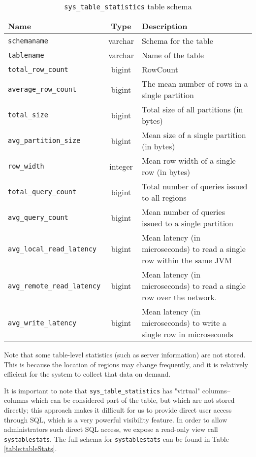 \begin{table}
				\begin{tabular}{|l|c|p{6cm}|}
								\hline
								\bf{Name}															& \bf{Type}	&	\bf{Description} \\ \hline	
								\texttt{schemaname}										&	varchar		&	Schema for the table \\ \hline
								\texttt{tablename}										&	varchar		&	Name of the table \\ \hline
								\texttt{total\_row\_count}						&	bigint		& RowCount \\ \hline
								\texttt{average\_row\_count}					&	bigint		& The mean number of rows in a single partition \\ \hline
								\texttt{total\_size}									&	bigint		&	Total size of all partitions (in bytes) \\ \hline
								\texttt{avg\_partition\_size}					&	bigint		&	Mean size of a single partition (in bytes) \\ \hline
								\texttt{row\_width}										&	integer		&	Mean row width of a single row (in bytes) \\ \hline
								\texttt{total\_query\_count}					&	bigint		&	Total number of queries issued to all regions\\ \hline
								\texttt{avg\_query\_count}						&	bigint		&	Mean number of queries issued to a single partition\\ \hline
								\texttt{avg\_local\_read\_latency}		&	bigint		&	Mean latency (in microseconds) to read a single row within the same JVM\\ \hline
								\texttt{avg\_remote\_read\_latency}		&	bigint		&	Mean latency (in microseconds) to read a single row over the network.\\ \hline
								\texttt{avg\_write\_latency}					&	bigint		&	Mean latency (in microseconds) to write a single row in microseconds\\ \hline
				\end{tabular}
				\caption{\texttt{sys\_table\_statistics} table schema}
				\label{table:tableStatistics}
\end{table}

Note that some table-level statistics (such as server information) are not stored. This is because the location of regions may change frequently, and it is relatively efficient for the system to collect that data on demand.

It is important to note that \texttt{sys\_table\_statistics} has "virtual" columns--columns which can be considered part of the table, but which are not stored directly; this approach makes it difficult for us to provide direct user access through SQL, which is a very powerful visibility feature. In order to allow administrators such direct SQL access, we expose a read-only view call \texttt{systablestats}. The full schema for \texttt{systablestats} can be found in Table-\ref{table:tableStats}.


